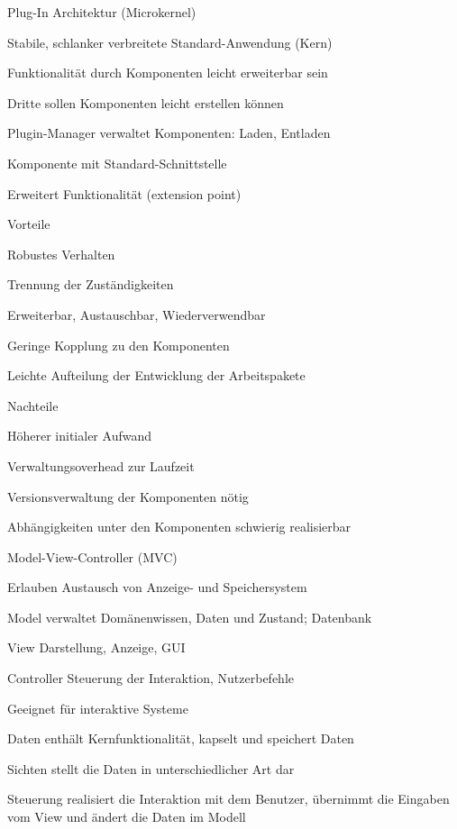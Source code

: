 \documentclass[a4paper]{article}
\begin{document}
\begin{multicols}{3}
  Plug-In Architektur (Microkernel)
  \begin{itemize*}
    \item Stabile, schlanker verbreitete Standard-Anwendung (Kern)
    \item Funktionalität durch Komponenten leicht erweiterbar sein
    \item Dritte sollen Komponenten leicht erstellen können
    \item Plugin-Manager verwaltet Komponenten: Laden, Entladen
    \begin{itemize*}
      \item Komponente mit Standard-Schnittstelle
      \item Erweitert Funktionalität (extension point)
    \end{itemize*}
    \item Vorteile
    \begin{itemize*}
      \item Robustes Verhalten
      \item Trennung der Zuständigkeiten
      \item Erweiterbar, Austauschbar, Wiederverwendbar
      \item Geringe Kopplung zu den Komponenten
      \item Leichte Aufteilung der Entwicklung der Arbeitspakete
    \end{itemize*}
    \item Nachteile
    \begin{itemize*}
      \item Höherer initialer Aufwand
      \item Verwaltungsoverhead zur Laufzeit
      \item Versionsverwaltung der Komponenten nötig
      \item Abhängigkeiten unter den Komponenten schwierig realisierbar
    \end{itemize*}
  \end{itemize*}

  Model-View-Controller (MVC)
  \begin{itemize*}
    \item Erlauben Austausch von Anzeige- und Speichersystem
    \begin{description*}
      \item[Model] verwaltet Domänenwissen, Daten und Zustand; Datenbank
      \item[View] Darstellung, Anzeige, GUI
      \item[Controller] Steuerung der Interaktion, Nutzerbefehle
    \end{description*}
    \item Geeignet für interaktive Systeme
    \item Daten enthält Kernfunktionalität, kapselt und speichert Daten
    \item Sichten stellt die Daten in unterschiedlicher Art dar
    \item Steuerung realisiert die Interaktion mit dem Benutzer, übernimmt die Eingaben vom View und ändert die Daten im Modell
  \end{itemize*}


\end{multicols}
\end{document}
